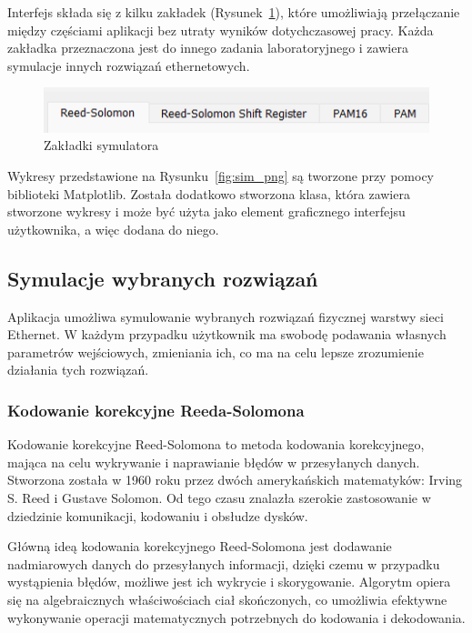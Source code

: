 Interfejs składa się z kilku zakładek (Rysunek~\ref{fig:zakladki_sim_image}), które umożliwiają przełączanie między częściami aplikacji bez utraty wyników dotychczasowej pracy. Każda zakładka przeznaczona jest do innego zadania laboratoryjnego i zawiera symulacje innych rozwiązań ethernetowych.

\begin{figure}[H]
    \centering
    \includegraphics{images/zakladki.png}
    \caption{Zakładki symulatora}
    \label{fig:zakladki_sim_image}
\end{figure}

Wykresy przedstawione na Rysunku~\ref{fig:sim_png} są tworzone przy pomocy biblioteki Matplotlib. Została dodatkowo stworzona klasa, która zawiera stworzone wykresy i może być użyta jako element graficznego interfejsu użytkownika, a więc dodana do niego.

\subsection{Symulacje wybranych rozwiązań}
Aplikacja umożliwa symulowanie wybranych rozwiązań fizycznej warstwy sieci Ethernet. W każdym przypadku użytkownik ma swobodę podawania własnych parametrów wejściowych, zmieniania ich, co ma na celu lepsze zrozumienie działania tych rozwiązań.

\subsubsection{Kodowanie korekcyjne Reeda-Solomona}
Kodowanie korekcyjne Reed-Solomona to metoda kodowania korekcyjnego, mająca na celu wykrywanie i naprawianie błędów w przesyłanych danych. Stworzona została w 1960 roku przez dwóch amerykańskich matematyków: Irving S. Reed i Gustave Solomon. Od tego czasu znalazła szerokie zastosowanie w dziedzinie komunikacji, kodowaniu i obsłudze dysków.

Główną ideą kodowania korekcyjnego Reed-Solomona jest dodawanie nadmiarowych danych do przesyłanych informacji, dzięki czemu w przypadku wystąpienia błędów, możliwe jest ich wykrycie i skorygowanie. Algorytm opiera się na algebraicznych właściwościach ciał skończonych, co umożliwia efektywne wykonywanie operacji matematycznych potrzebnych do kodowania i dekodowania.

